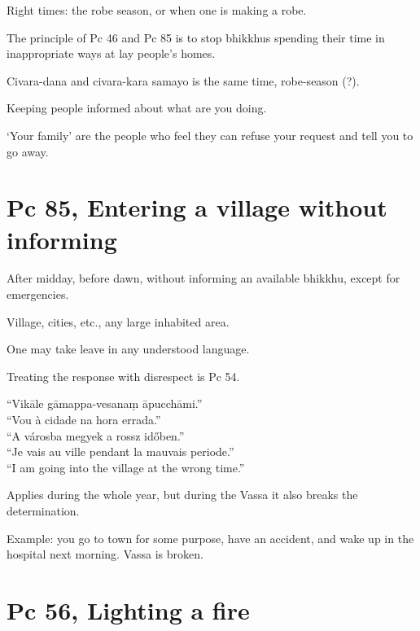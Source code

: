 Right times: the robe season, or when one is making a robe.

The principle of Pc 46 and Pc 85 is to stop bhikkhus spending their time
in inappropriate ways at lay people's homes.

Civara-dana and civara-kara samayo is the same time, robe-season (?).

Keeping people informed about what are you doing.

`Your family' are the people who feel they can refuse your request and
tell you to go away.

\section{Pc 85, Entering a village without informing}

\begin{multicols}{2}

After midday, before dawn, without informing an available bhikkhu,
except for emergencies.

Village, cities, etc., any large inhabited area.

One may take leave in any understood language.

Treating the response with disrespect is Pc 54.

``Vikāle gāmappa-vesanaṃ āpucchāmi.''\\
``Vou à cidade na hora errada.''\\
``A városba megyek a rossz időben.''\\
``Je vais au ville pendant la mauvais periode.''\\
``I am going into the village at the wrong time.''

Applies during the whole year, but during the Vassa it also breaks the
determination.

Example: you go to town for some purpose, have an accident, and wake up
in the hospital next morning. Vassa is broken.

\end{multicols}

\section{Pc 56, Lighting a fire}

